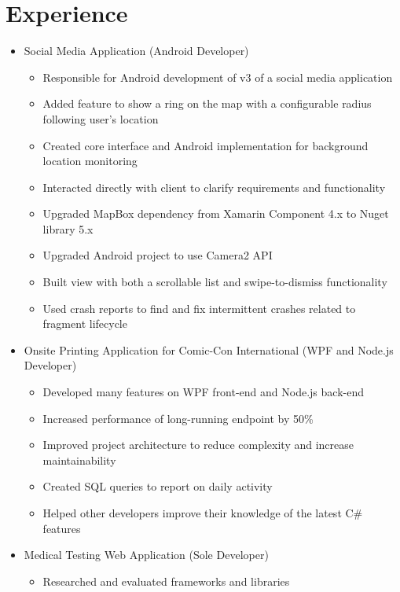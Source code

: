 \documentclass[12pt,letterpaper,sans]{moderncv}
\begin{document}
\section{Experience}
    \begin{itemize}[leftmargin=1.24in]
    	\item Social Media Application (Android Developer)
    		\begin{itemize}
    			\item Responsible for Android development of v3 of a social media application
    			\item Added feature to show a ring on the map with a configurable radius following user's location
    			\item Created core interface and Android implementation for background location monitoring
    			\item Interacted directly with client to clarify requirements and functionality
    			\item Upgraded MapBox dependency from Xamarin Component 4.x to Nuget library 5.x
    			\item Upgraded Android project to use Camera2 API
    			\item Built view with both a scrollable list and swipe-to-dismiss functionality
    			\item Used crash reports to find and fix intermittent crashes related to fragment lifecycle
    		\end{itemize}
    	\item Onsite Printing Application for Comic-Con International (WPF and Node.js Developer)
    		\begin{itemize}
    			\item Developed many features on WPF front-end and Node.js back-end
    			\item Increased performance of long-running endpoint by 50\%
    			\item Improved project architecture to reduce complexity and increase maintainability
    			\item Created SQL queries to report on daily activity
    			\item Helped other developers improve their knowledge of the latest C\# features
   			\end{itemize}
    	\item Medical Testing Web Application (Sole Developer)
	    	\begin{itemize}
	    		\item Researched and evaluated frameworks and libraries

\end{itemize}
\end{itemize}
\end{document}
